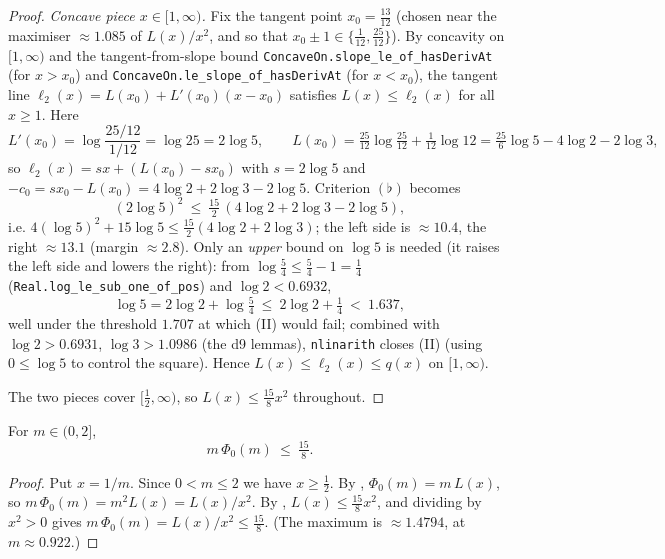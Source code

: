 \begin{proof}
\emph{Concave piece $x\in[1,\infty)$.} Fix the tangent point $x_0=\tfrac{13}{12}$
(chosen near the maximiser $\approx1.085$ of $L(x)/x^2$, and so that
$x_0\pm1\in\{\tfrac1{12},\tfrac{25}{12}\}$). By concavity on $[1,\infty)$ and the
tangent-from-slope bound \texttt{ConcaveOn.slope\_le\_of\_hasDerivAt} (for $x>x_0$)
and \texttt{ConcaveOn.le\_slope\_of\_hasDerivAt} (for $x<x_0$), the tangent line
$\ell_2(x)=L(x_0)+L'(x_0)(x-x_0)$ satisfies $L(x)\le\ell_2(x)$ for all $x\ge1$. Here
\[
  L'(x_0)=\log\frac{25/12}{1/12}=\log25=2\log5,\qquad
  L(x_0)=\tfrac{25}{12}\log\tfrac{25}{12}+\tfrac1{12}\log12
        =\tfrac{25}{6}\log5-4\log2-2\log3,
\]
so $\ell_2(x)=sx+(L(x_0)-sx_0)$ with $s=2\log5$ and
$-c_0=sx_0-L(x_0)=4\log2+2\log3-2\log5$. Criterion $(\flat)$ becomes
\[
  (2\log5)^2\ \le\ \tfrac{15}{2}\,(4\log2+2\log3-2\log5),
  \tag{II}
\]
i.e. $4(\log5)^2+15\log5\le \tfrac{15}2(4\log2+2\log3)$; the left side is
$\approx10.4$, the right $\approx13.1$ (margin $\approx2.8$). Only an \emph{upper}
bound on $\log5$ is needed (it raises the left side and lowers the right): from
$\log\tfrac54\le\tfrac54-1=\tfrac14$ (\texttt{Real.log\_le\_sub\_one\_of\_pos}) and
$\log2<0.6932$,
\[
  \log5=2\log2+\log\tfrac54\ \le\ 2\log2+\tfrac14\ <\ 1.637 ,
\]
well under the threshold $1.707$ at which (II) would fail; combined with
$\log2>0.6931$, $\log3>1.0986$ (the d9 lemmas), \texttt{nlinarith} closes (II)
(using $0\le\log5$ to control the square). Hence $L(x)\le\ell_2(x)\le q(x)$ on
$[1,\infty)$.

The two pieces cover $[\tfrac12,\infty)$, so $L(x)\le\tfrac{15}8x^2$ throughout.
\end{proof}

\begin{lemma}
\label{lem:lb_slice_bound}
\leanok
{}
For $m\in(0,2]$,
\[
  m\,\Phi_0(m)\ \le\ \tfrac{15}{8}.
\]
\end{lemma}

\begin{proof}
\leanok
{}
Put $x=1/m$. Since $0<m\le2$ we have $x\ge\tfrac12$. By
, $\Phi_0(m)=m\,L(x)$, so
$m\,\Phi_0(m)=m^2L(x)=L(x)/x^2$. By ,
$L(x)\le\tfrac{15}8x^2$, and dividing by $x^2>0$ gives
$m\,\Phi_0(m)=L(x)/x^2\le\tfrac{15}8$. (The maximum is $\approx1.4794$, at
$m\approx0.922$.)
\end{proof}

